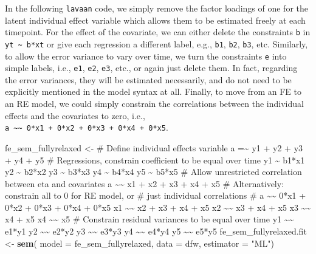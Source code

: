 \documentclass[]{interact}
\theoremstyle{plain}%
\theoremstyle{definition}
\theoremstyle{remark}
\newenvironment{Shaded}{\begin{snugshade}}{\end{snugshade}}
\newcommand{\DataTypeTok}[1]{\textcolor[rgb]{0.13,0.29,0.53}{#1}}
\newcommand{\KeywordTok}[1]{\textcolor[rgb]{0.13,0.29,0.53}{\textbf{#1}}}
\newcommand{\NormalTok}[1]{#1}
\newcommand{\StringTok}[1]{\textcolor[rgb]{0.31,0.60,0.02}{#1}}
\begin{document}
In the following \texttt{lavaan} code, we simply remove the factor
loadings of one for the latent individual effect variable which allows
them to be estimated freely at each timepoint. For the effect of the
covariate, we can either delete the constraints \texttt{b} in
\texttt{yt\ \textasciitilde{}\ b*xt} or give each regression a different
label, e.g., \texttt{b1}, \texttt{b2}, \texttt{b3}, etc. Similarly, to
allow the error variance to vary over time, we turn the constraints
\texttt{e} into simple labels, i.e., \texttt{e1}, \texttt{e2},
\texttt{e3}, etc., or again just delete them. In fact, regarding the
error variances, they will be estimated necessarily, and do not need to
be explicitly mentioned in the model syntax at all. Finally, to move
from an FE to an RE model, we could simply constrain the correlations
between the individual effects and the covariates to zero, i.e.,
\texttt{a\ \textasciitilde{}\textasciitilde{}\ 0*x1\ +\ 0*x2\ +\ 0*x3\ +\ 0*x4\ +\ 0*x5}.

\singlespacing

\begin{Shaded}
\begin{Highlighting}[]
\NormalTok{fe\_sem\_fullyrelaxed \textless{}{-}}\StringTok{ \textquotesingle{}}
\StringTok{\# Define individual effects variable }
\StringTok{a =\textasciitilde{} y1 + y2 + y3 + y4 + y5}
\StringTok{\# Regressions, constrain coefficient to be equal over time}
\StringTok{y1 \textasciitilde{} b1*x1}
\StringTok{y2 \textasciitilde{} b2*x2 }
\StringTok{y3 \textasciitilde{} b3*x3}
\StringTok{y4 \textasciitilde{} b4*x4}
\StringTok{y5 \textasciitilde{} b5*x5}
\StringTok{\# Allow unrestricted correlation between eta and covariates}
\StringTok{a \textasciitilde{}\textasciitilde{} x1 + x2 + x3 + x4 + x5}
\StringTok{\# Alternatively: constrain all to 0 for RE model, or}
\StringTok{\# just individual correlations}
\StringTok{\# a \textasciitilde{}\textasciitilde{} 0*x1 + 0*x2 + 0*x3 + 0*x4 + 0*x5}
\StringTok{x1 \textasciitilde{}\textasciitilde{} x2 + x3 + x4 + x5}
\StringTok{x2 \textasciitilde{}\textasciitilde{} x3 + x4 + x5}
\StringTok{x3 \textasciitilde{}\textasciitilde{} x4 + x5}
\StringTok{x4 \textasciitilde{}\textasciitilde{} x5}
\StringTok{\# Constrain residual variances to be equal over time}
\StringTok{y1 \textasciitilde{}\textasciitilde{} e1*y1}
\StringTok{y2 \textasciitilde{}\textasciitilde{} e2*y2}
\StringTok{y3 \textasciitilde{}\textasciitilde{} e3*y3}
\StringTok{y4 \textasciitilde{}\textasciitilde{} e4*y4}
\StringTok{y5 \textasciitilde{}\textasciitilde{} e5*y5}
\StringTok{\textquotesingle{}}
\NormalTok{fe\_sem\_fullyrelaxed.fit \textless{}{-}}\StringTok{ }\KeywordTok{sem}\NormalTok{( }\DataTypeTok{model =}\NormalTok{ fe\_sem\_fullyrelaxed, }
                                \DataTypeTok{data =}\NormalTok{ dfw, }
                                \DataTypeTok{estimator =} \StringTok{"ML"}\NormalTok{)}
\end{Highlighting}
\end{Shaded}
\end{document}
